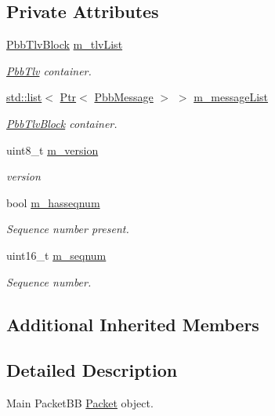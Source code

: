 \subsection*{Private Attributes}
\begin{DoxyCompactItemize}
\item 
\hyperlink{classns3_1_1PbbTlvBlock}{Pbb\+Tlv\+Block} \hyperlink{classns3_1_1PbbPacket_af24e9b73e6b1d8c113b52041860e9a35}{m\+\_\+tlv\+List}
\begin{DoxyCompactList}\small\item\em \hyperlink{classns3_1_1PbbTlv}{Pbb\+Tlv} container. \end{DoxyCompactList}\item 
\hyperlink{openflow-interface_8h_afd9bcfa176617760671b67580f536fa7}{std\+::list}$<$ \hyperlink{classns3_1_1Ptr}{Ptr}$<$ \hyperlink{classns3_1_1PbbMessage}{Pbb\+Message} $>$ $>$ \hyperlink{classns3_1_1PbbPacket_a46d3b200a9545e084a7e4db9ed2a9963}{m\+\_\+message\+List}
\begin{DoxyCompactList}\small\item\em \hyperlink{classns3_1_1PbbTlvBlock}{Pbb\+Tlv\+Block} container. \end{DoxyCompactList}\item 
uint8\+\_\+t \hyperlink{classns3_1_1PbbPacket_a087fc7baaed63b3bf0e8e0ec5f555642}{m\+\_\+version}
\begin{DoxyCompactList}\small\item\em version \end{DoxyCompactList}\item 
bool \hyperlink{classns3_1_1PbbPacket_a2d859b0a350899299287d3f07451008c}{m\+\_\+hasseqnum}
\begin{DoxyCompactList}\small\item\em Sequence number present. \end{DoxyCompactList}\item 
uint16\+\_\+t \hyperlink{classns3_1_1PbbPacket_ad208a9f1466b5c3355886225db32d003}{m\+\_\+seqnum}
\begin{DoxyCompactList}\small\item\em Sequence number. \end{DoxyCompactList}\end{DoxyCompactItemize}
\subsection*{Additional Inherited Members}


\subsection{Detailed Description}
Main Packet\+BB \hyperlink{classns3_1_1Packet}{Packet} object. 

